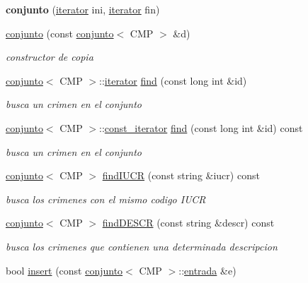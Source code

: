 \begin{DoxyCompactItemize}
\item 
\hypertarget{classconjunto_a15f74d8bf6b88f7b7f5c4cc8e8507b19}{}{\bfseries conjunto} (\hyperlink{classconjunto_1_1iterator}{iterator} ini, \hyperlink{classconjunto_1_1iterator}{iterator} fin)\label{classconjunto_a15f74d8bf6b88f7b7f5c4cc8e8507b19}

\item 
\hyperlink{classconjunto_a40c5625e186cfaf7b05c7001f798a1b8}{conjunto} (const \hyperlink{classconjunto}{conjunto}$<$ C\+M\+P $>$ \&d)
\begin{DoxyCompactList}\small\item\em constructor de copia \end{DoxyCompactList}\item 
\hyperlink{classconjunto}{conjunto}$<$ C\+M\+P $>$\+::\hyperlink{classconjunto_1_1iterator}{iterator} \hyperlink{classconjunto_a01ef97588beb5b28f18d2d8c02881f4c}{find} (const long int \&id)
\begin{DoxyCompactList}\small\item\em busca un crimen en el conjunto \end{DoxyCompactList}\item 
\hyperlink{classconjunto}{conjunto}$<$ C\+M\+P $>$\+::\hyperlink{classconjunto_1_1const__iterator}{const\+\_\+iterator} \hyperlink{classconjunto_a725ddba7aa25ad0576f13000e035ee6f}{find} (const long int \&id) const 
\begin{DoxyCompactList}\small\item\em busca un crimen en el conjunto \end{DoxyCompactList}\item 
\hyperlink{classconjunto}{conjunto}$<$ C\+M\+P $>$ \hyperlink{classconjunto_a076dc70516af91c07b570bca24c6d9f7}{find\+I\+U\+C\+R} (const string \&iucr) const 
\begin{DoxyCompactList}\small\item\em busca los crimenes con el mismo codigo I\+U\+C\+R \end{DoxyCompactList}\item 
\hyperlink{classconjunto}{conjunto}$<$ C\+M\+P $>$ \hyperlink{classconjunto_ab4f2fdce330e5b53c3ac8f529ccd435d}{find\+D\+E\+S\+C\+R} (const string \&descr) const 
\begin{DoxyCompactList}\small\item\em busca los crimenes que contienen una determinada descripcion \end{DoxyCompactList}\item 
bool \hyperlink{classconjunto_a61c22092268cc91439b93a2fd96e4173}{insert} (const \hyperlink{classconjunto}{conjunto}$<$ C\+M\+P $>$\+::\hyperlink{classconjunto_a7630ace7cb17bcec07daf5804f1a0780}{entrada} \&e)

\end{DoxyCompactItemize}

